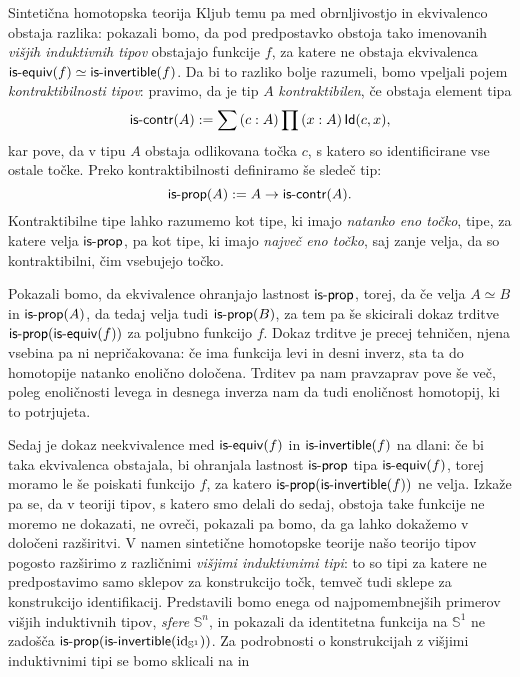 \documentclass[a4paper, slovene]{article}
\begin{document}
\begin{section}{Sintetična homotopska teorija}
  Kljub temu pa med obrnljivostjo in ekvivalenco obstaja
  razlika: pokazali bomo, da pod predpostavko obstoja tako imenovanih
  \emph{višjih induktivnih tipov} obstajajo funkcije \(f\), za katere ne obstaja
  ekvivalenca \(\textnormal{\textsf{is-equiv}}(f) \simeq \textnormal{\textsf{is-invertible}}(f)\). Da bi to razliko bolje razumeli, bomo vpeljali
  pojem \emph{kontraktibilnosti tipov}: pravimo, da je tip \(A\) \emph{kontraktibilen},
  če obstaja element tipa
  \[\textnormal{\textsf{is-contr}}(A) := \sum \left( c : A \right) \prod \left( x : A \right) \textnormal{\textsf{Id}}(c, x),\]
  kar pove, da v tipu \(A\) obstaja odlikovana točka \(c\), s katero so identificirane
  vse ostale točke.
  Preko kontraktibilnosti definiramo še sledeč tip:
  \[\textnormal{\textsf{is-prop}}(A) := A \to \textnormal{\textsf{is-contr}}(A).\]
  Kontraktibilne tipe lahko razumemo kot tipe, ki imajo \emph{natanko eno točko},
  tipe, za katere velja \(\textnormal{\textsf{is-prop}}\), pa kot tipe, ki imajo \emph{največ eno točko}, saj
  zanje velja, da so kontraktibilni, čim vsebujejo točko.

  Pokazali bomo, da ekvivalence ohranjajo lastnost \(\textnormal{\textsf{is-prop}}\), torej, da
  če velja \(A \simeq B\) in \(\textnormal{\textsf{is-prop}}(A)\), da tedaj velja tudi \(\textnormal{\textsf{is-prop}}(B)\), za tem pa še
  skicirali dokaz trditve \(\textnormal{\textsf{is-prop}}(\textnormal{\textsf{is-equiv}}(f))\) za poljubno funkcijo \(f\).
  Dokaz trditve je precej tehničen, njena vsebina pa ni nepričakovana:
  če ima funkcija levi in desni inverz, sta ta do homotopije natanko enolično določena.
  Trditev pa nam pravzaprav pove še več,
  poleg enoličnosti levega in desnega inverza nam da tudi enoličnost homotopij, ki to
  potrjujeta.

  Sedaj je dokaz neekvivalence med \(\textnormal{\textsf{is-equiv}}(f)\) in \(\textnormal{\textsf{is-invertible}}(f)\) na dlani: če bi taka
  ekvivalenca obstajala, bi ohranjala lastnost \(\textnormal{\textsf{is-prop}}\) tipa \(\textnormal{\textsf{is-equiv}}(f)\), torej
  moramo le še poiskati funkcijo \(f\), za katero \(\textnormal{\textsf{is-prop}}(\textnormal{\textsf{is-invertible}}(f))\) ne velja.
  Izkaže pa se, da v teoriji tipov, s katero smo delali do sedaj, obstoja take funkcije
  ne moremo ne dokazati, ne ovreči, pokazali pa bomo, da ga lahko dokažemo v določeni
  razširitvi. V namen sintetične homotopske teorije našo teorijo tipov
  pogosto razširimo z različnimi \emph{višjimi induktivnimi tipi}: to so tipi za katere ne
  predpostavimo samo sklepov za konstrukcijo točk, temveč tudi sklepe za konstrukcijo
  identifikacij. Predstavili bomo enega od najpomembnejših primerov višjih induktivnih
  tipov, \emph{sfere} \(\mathbb{S}^{n}\), in pokazali da identitetna funkcija
  na \(\mathbb{S}^{1}\) ne zadošča \(\textnormal{\textsf{is-prop}}(\textnormal{\textsf{is-invertible}}(\mathrm{id}_{\mathbb{S}^{1}}))\). Za
  podrobnosti o konstrukcijah z višjimi induktivnimi tipi se bomo sklicali na
  \cite{hottbook} in \cite{ljungström2024symmetric}
\end{section}
\end{document}
